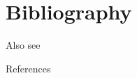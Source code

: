 \documentclass[11pt,ignorenonframetext,aspectratio=169]{beamer}
\begin{document}
\hypertarget{bibliography}{%
\section{Bibliography}\label{bibliography}}

\begin{frame}{Also see}
\protect\hypertarget{also-see}{}
\end{frame}

\begin{frame}{References}
\protect\hypertarget{references}{}
\end{frame}
\end{document}
